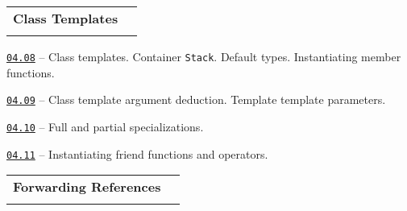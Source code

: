 \documentclass[a4paper,12pt]{article}
\renewenvironment{itemize}
{
    \begin{list}{\labelitemi}
    {
      \setlength{\topsep}{0pt}
      \setlength{\partopsep}{0pt}
      \setlength{\parskip}{0pt}
      \setlength{\itemsep}{0pt}
      \setlength{\parsep}{0pt}
      \setlength{\leftmargin}{14.5pt}
    }
}{\end{list}}
\begin{document}
\bigskip\medskip

\begin{tabular}{!{\vrule width 1pt}L{3.2cm}!{\vrule width 1pt}L{15.8cm}!{\vrule width 0pt}} 


\textbf{Class Templates} & \\


\end{tabular}

\medskip\smallskip

\begin{itemize}

    \item \href{https://github.com/i-s-m-mipt/Education/blob/master/projects/examples/source/04.08.cpp}{\texttt{04.08}} -- Class templates. Container \lstinline{Stack}. Default types. Instantiating member functions.

    \smallskip

    \item \href{https://github.com/i-s-m-mipt/Education/blob/master/projects/examples/source/04.09.cpp}{\texttt{04.09}} -- Class template argument deduction. Template template parameters.

    \smallskip

    \item \href{https://github.com/i-s-m-mipt/Education/blob/master/projects/examples/source/04.10.cpp}{\texttt{04.10}} -- Full and partial specializations.

    \smallskip

    \item \href{https://github.com/i-s-m-mipt/Education/blob/master/projects/examples/source/04.11.cpp}{\texttt{04.11}} -- Instantiating friend functions and operators.

\end{itemize}

\bigskip\medskip

\begin{tabular}{!{\vrule width 1pt}L{4.5cm}!{\vrule width 1pt}L{14.5cm}!{\vrule width 0pt}} 


\textbf{Forwarding References} & \\


\end{tabular}

\medskip\smallskip
\end{document}
